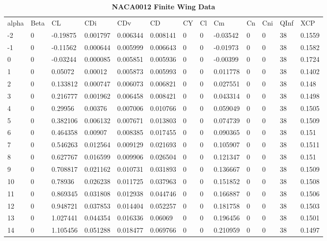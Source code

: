 \begin{singlespace}
\begin{table}
\caption{\textbf{NACA0012 Finite Wing Data}} \label{table:NACA0012_finite}
\begin{tabular}{|l|l|l|l|l|l|l|l|l|l|l|l|l|}
alpha & Beta & CL       & CDi      & CDv      & CD       & CY & Cl & Cm       & Cn & Cni & QInf & XCP    \\
-2    & 0    & -0.19875 & 0.001797 & 0.006344 & 0.008141 & 0  & 0  & -0.03542 & 0  & 0   & 38   & 0.1559 \\
-1    & 0    & -0.11562 & 0.000644 & 0.005999 & 0.006643 & 0  & 0  & -0.01973 & 0  & 0   & 38   & 0.1582 \\
0     & 0    & -0.03244 & 0.000085 & 0.005851 & 0.005936 & 0  & 0  & -0.00399 & 0  & 0   & 38   & 0.1724 \\
1     & 0    & 0.05072  & 0.00012  & 0.005873 & 0.005993 & 0  & 0  & 0.011778 & 0  & 0   & 38   & 0.1402 \\
2     & 0    & 0.133812 & 0.000747 & 0.006073 & 0.006821 & 0  & 0  & 0.027551 & 0  & 0   & 38   & 0.148  \\
3     & 0    & 0.216777 & 0.001962 & 0.006458 & 0.008421 & 0  & 0  & 0.043314 & 0  & 0   & 38   & 0.1498 \\
4     & 0    & 0.29956  & 0.00376  & 0.007006 & 0.010766 & 0  & 0  & 0.059049 & 0  & 0   & 38   & 0.1505 \\
5     & 0    & 0.382106 & 0.006132 & 0.007671 & 0.013803 & 0  & 0  & 0.074739 & 0  & 0   & 38   & 0.1509 \\
6     & 0    & 0.464358 & 0.00907  & 0.008385 & 0.017455 & 0  & 0  & 0.090365 & 0  & 0   & 38   & 0.151  \\
7     & 0    & 0.546263 & 0.012564 & 0.009129 & 0.021693 & 0  & 0  & 0.105907 & 0  & 0   & 38   & 0.1511 \\
8     & 0    & 0.627767 & 0.016599 & 0.009906 & 0.026504 & 0  & 0  & 0.121347 & 0  & 0   & 38   & 0.151  \\
9     & 0    & 0.708817 & 0.021162 & 0.010731 & 0.031893 & 0  & 0  & 0.136667 & 0  & 0   & 38   & 0.1509 \\
10    & 0    & 0.78936  & 0.026238 & 0.011725 & 0.037963 & 0  & 0  & 0.151852 & 0  & 0   & 38   & 0.1508 \\
11    & 0    & 0.869345 & 0.031808 & 0.012938 & 0.044746 & 0  & 0  & 0.166887 & 0  & 0   & 38   & 0.1506 \\
12    & 0    & 0.948721 & 0.037853 & 0.014404 & 0.052257 & 0  & 0  & 0.181758 & 0  & 0   & 38   & 0.1503 \\
13    & 0    & 1.027441 & 0.044354 & 0.016336 & 0.06069  & 0  & 0  & 0.196456 & 0  & 0   & 38   & 0.1501 \\
14    & 0    & 1.105456 & 0.051288 & 0.018477 & 0.069766 & 0  & 0  & 0.210959 & 0  & 0   & 38   & 0.1497 
\end{tabular}
\end{table}


\end{singlespace}
